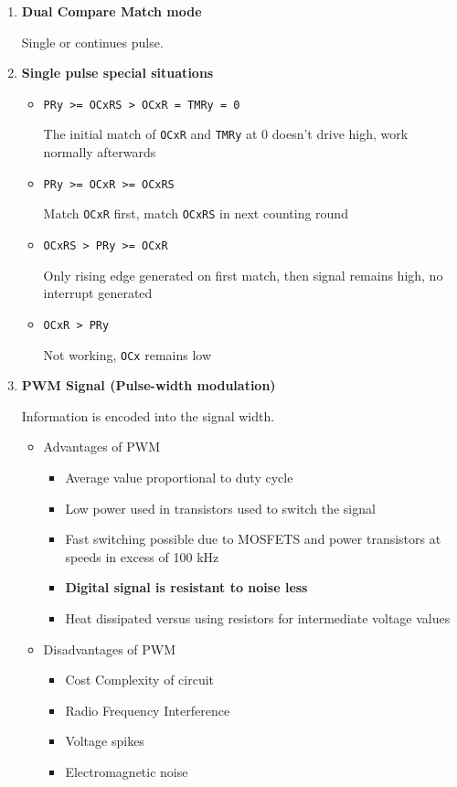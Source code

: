 \documentclass[a4paper]{article}
\begin{document}
\begin{enumerate}[label = \arabic*.]
    \item \textbf{Dual Compare Match mode}
      \par Single or continues pulse.

    \item \textbf{Single pulse special situations}
      \begin{itemize}[leftmargin = 1cm]
        \item \verb|PRy >= OCxRS > OCxR = TMRy = 0|
          \par The initial match of \verb|OCxR| and \verb|TMRy| at 0 doesn't drive high, work normally afterwards
        \item \verb|PRy >= OCxR >= OCxRS|
          \par Match \verb|OCxR| first, match \verb|OCxRS| in next counting round
        \item \verb|OCxRS > PRy >= OCxR|
          \par Only rising edge generated on first match, then signal remains high, no interrupt generated
        \item \verb|OCxR > PRy|
          \par Not working, \verb|OCx| remains low
      \end{itemize}

    \item \textbf{PWM Signal (Pulse-width modulation)}
      \par Information is encoded into the signal width.
      \begin{itemize}[leftmargin = 1cm]
        \item Advantages of PWM
          \begin{itemize}[leftmargin = 1cm]
            \item Average value proportional to duty cycle
            \item Low power used in transistors used to switch the signal
            \item Fast switching possible due to MOSFETS and power transistors at speeds in excess of 100 kHz
            \item \textbf{Digital signal is resistant to noise less}
            \item Heat dissipated versus using resistors for intermediate voltage values
          \end{itemize}
        \item Disadvantages of PWM
          \begin{itemize}[leftmargin = 1cm]
            \item Cost Complexity of circuit
            \item Radio Frequency Interference
            \item Voltage spikes
            \item Electromagnetic noise
          \end{itemize}
      \end{itemize}


\end{enumerate}
\end{document}
